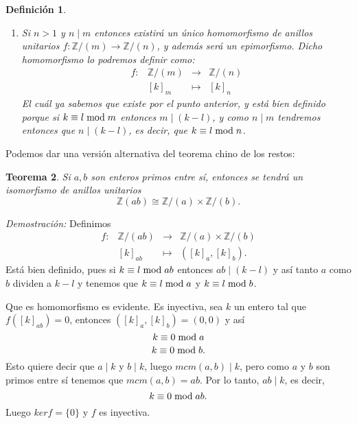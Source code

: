 \documentclass[12pt]{article}
\newtheorem{theorem}{Teorema}[section]
\newtheorem{definition}[theorem]{Definición}
\begin{document}
\begin{definition}
\begin{enumerate}
\item Si $n>1$ y $n\mid m$ entonces existirá un único homomorfismo de anillos unitarios $f \colon \mathbb{Z}/(m) \longrightarrow \mathbb{Z}/(n)$, y además será un epimorfismo. Dicho homomorfismo lo podremos definir como: $$\begin{array}{rccl}
f \colon &\mathbb{Z}/(m)&\longrightarrow &\mathbb{Z}/(n) \\
&[k]_{m}& \longmapsto &[k]_{n}
\end{array}
$$
El cuál ya sabemos que existe por el punto anterior, y está bien definido porque si $k \equiv l \hspace{0.1cm} \text{mod} \hspace{0.1cm} m$ entonces $m \mid (k-l)$, y como $n \mid m$ tendremos entonces que $n \mid (k-l)$, es decir, que $k \equiv l \hspace{0.1cm} \text{mod} \hspace{0.1cm} n$.
\end{enumerate}
\end{definition}

Podemos dar una versión alternativa del teorema chino de los restos:

\begin{theorem}
Si $a,b$ son enteros primos entre sí, entonces se tendrá un isomorfismo de anillos unitarios $$\mathbb{Z}(ab) \cong \mathbb{Z}/(a) \times \mathbb{Z}/(b).$$
\end{theorem}
\emph{Demostración: } Definimos $$\begin{array}{rccl}
f \colon &\mathbb{Z}/(ab)&\longrightarrow &\mathbb{Z}/(a) \times \mathbb{Z}/(b)\\
&[k]_{ab}& \longmapsto &([k]_{a}, [k]_{b}).
\end{array}
$$ Está bien definido, pues si $k \equiv l \hspace{0.1cm} \text{mod} \hspace{0.1cm} ab$ entonces $ab \mid (k-l)$ y así tanto $a$ como $b$ dividen a $k-l$ y tenemos que $k \equiv l \hspace{0.1cm} \text{mod} \hspace{0.1cm} a$ y $k \equiv l \hspace{0.1cm} \text{mod} \hspace{0.1cm} b$. 

Que es homomorfismo es evidente. Es inyectiva, sea $k$ un entero tal que $f([k]_{ab}) = 0$, entonces $([k]_{a}, [k]_{b}) = (0,0)$ y así $$k \equiv 0 \hspace{0.1cm} \text{mod} \hspace{0.1cm} a$$ $$k \equiv 0 \hspace{0.1cm} \text{mod} \hspace{0.1cm} b.$$ Esto quiere decir que $a \mid k$ y $b \mid k$, luego $mcm(a,b) \mid k$, pero como $a$ y $b$ son primos entre sí tenemos que $mcm(a,b) = ab$. Por lo tanto, $ab \mid k$, es decir, $$k \equiv 0 \hspace{0.1cm} \text{mod} \hspace{0.1cm} ab.$$ Luego $ker f = \lbrace 0 \rbrace$ y $f$ es  inyectiva.
\end{document}
